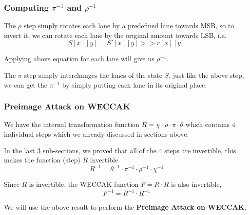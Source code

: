\documentclass[10pt,twoside]{article}
\newcommand\bold\textbf
\begin{document}
\subsubsection{Computing $\pi^{-1}$ and $\rho^{-1}$}

The $\rho$ step simply rotates each lane by a predefined lane towards MSB, so to invert it, we can rotate each lane by the original amount towards LSB, i.e.
$$S[x][y] = S'[x][y] >> r[x][y]$$

Applying above equation for each lane will give us $\rho^{-1}$. \newline

The $\pi$ step simply interchanges the lanes of the state $S$, just like the above step, we can get the $\pi^{-1}$ by simply putting each lane in its original place.

\subsubsection{Preimage Attack on WECCAK} \label{pre-image}

We have the internal transformation function $R=\chi\cdot\rho\cdot\pi\cdot\theta$ which contains $4$ individual steps which we already discussed in sections above. \newline

In the last $3$ sub-sections, we proved that all of the $4$ steps are invertible, this makes the function (step) $R$ invertible
$$R^{-1} = \theta^{-1}\cdot\pi^{-1}\cdot\rho^{-1}\cdot\chi^{-1}$$

Since $R$ is invertible, the WECCAK function $F = R\cdot R$ is also invertible,
$$F^{-1} = R^{-1} \cdot R^{-1}$$

We will use the above result to perform the \bold{Preimage Attack on WECCAK}.
\end{document}
